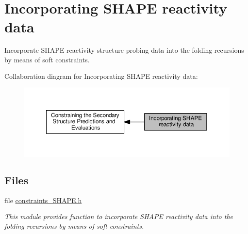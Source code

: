 \hypertarget{group__SHAPE__reactivities}{}\section{Incorporating S\+H\+A\+P\+E reactivity data}
\label{group__SHAPE__reactivities}


Incorporate S\+H\+A\+P\+E reactivity structure probing data into the folding recursions by means of soft constraints.  


Collaboration diagram for Incorporating S\+H\+A\+P\+E reactivity data\+:
\nopagebreak
\begin{figure}[H]
\begin{center}
\leavevmode
\includegraphics[width=350pt]{group__SHAPE__reactivities}
\end{center}
\end{figure}
\subsection*{Files}
\begin{DoxyCompactItemize}
\item 
file \hyperlink{constraints__SHAPE_8h}{constraints\+\_\+\+S\+H\+A\+P\+E.\+h}
\begin{DoxyCompactList}\small\item\em This module provides function to incorporate S\+H\+A\+P\+E reactivity data into the folding recursions by means of soft constraints. \end{DoxyCompactList}\end{DoxyCompactItemize}
